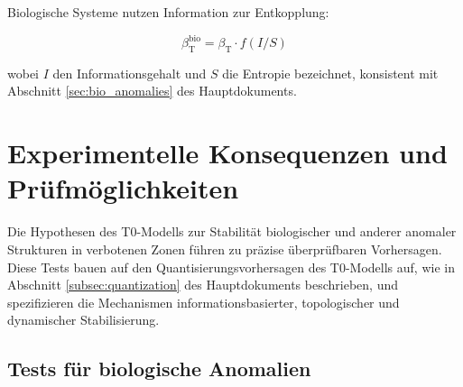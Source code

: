 \documentclass[12pt,a4paper]{article}
\newcommand{\betaT}{\beta_{\text{T}}}
\begin{document}
	Biologische Systeme nutzen Information zur Entkopplung:
	
	\begin{equation}
		\betaT^{\text{bio}} = \betaT \cdot f(I/S)
	\end{equation}
	
	wobei \(I\) den Informationsgehalt und \(S\) die Entropie bezeichnet, konsistent mit Abschnitt \ref{sec:bio_anomalies} des Hauptdokuments.
	
	\section{Experimentelle Konsequenzen und Prüfmöglichkeiten}
	\label{sec:experimentelle_konsequenzen}
	
	Die Hypothesen des T0-Modells zur Stabilität biologischer und anderer anomaler Strukturen in verbotenen Zonen führen zu präzise überprüfbaren Vorhersagen. Diese Tests bauen auf den Quantisierungsvorhersagen des T0-Modells auf, wie in Abschnitt \ref{subsec:quantization} des Hauptdokuments beschrieben, und spezifizieren die Mechanismen informationsbasierter, topologischer und dynamischer Stabilisierung.
	
	\subsection{Tests für biologische Anomalien}
	
\end{document}
